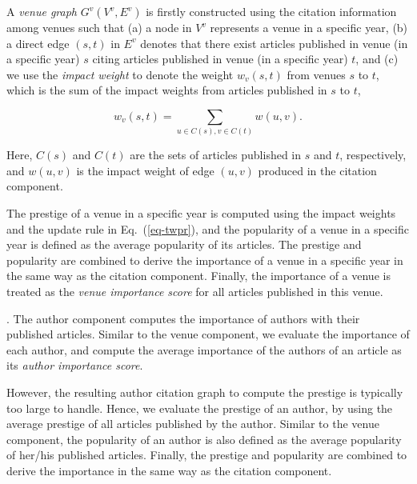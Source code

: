 A {\em venue graph} $G^v(V^v, E^v)$ is firstly constructed using the citation information among venues such that (a) a node in $V^v$ represents a venue in a specific year, (b) a direct edge $(s,t)$ in $E^v$ denotes that there exist articles published in venue (in a specific year) $s$ citing articles published in venue (in a specific year) $t$, and (c) we use the {\em impact weight} to denote the weight $w_v(s,t)$ from venues $s$ to $t$, which is the sum of the impact weights from articles published in $s$ to $t$, \ie

\vspace{-1ex}
\begin{small}
\begin{equation} \label{eq-infl-weights-v}
w_v(s,t)  = \sum_{u\in C(s), v\in C(t)} w(u,v).
\end{equation}
\end{small}
\noindent
Here, $C(s)$ and $C(t)$ are the sets of articles published in $s$ and $t$, respectively, and $w(u,v)$ is the impact weight of edge $(u, v)$ produced in the citation component.

The prestige of a venue in a specific year is computed using the impact weights and the update rule in Eq.~(\ref{eq-twpr}), and the popularity of a venue in a specific year is defined as the average popularity of its articles. The prestige and popularity are combined to derive the importance of a venue in a specific year in the same way as the citation component. Finally, the importance of a venue is treated as the {\em venue importance score} for all articles published in this venue.






.
The author component computes the importance of authors with their published articles.
%
Similar to the venue component, we evaluate the importance of each author, and compute the average importance of the authors of an article as its {\em author importance score}.

However, the resulting author citation graph to compute the prestige is typically too large to handle. Hence, we evaluate the prestige of an author, by using the average prestige of all articles published by the author. Similar to the venue component, the popularity of an author is also defined as the average popularity of her/his published articles. Finally, the prestige and popularity are combined to derive the importance in the same way as the citation component.


